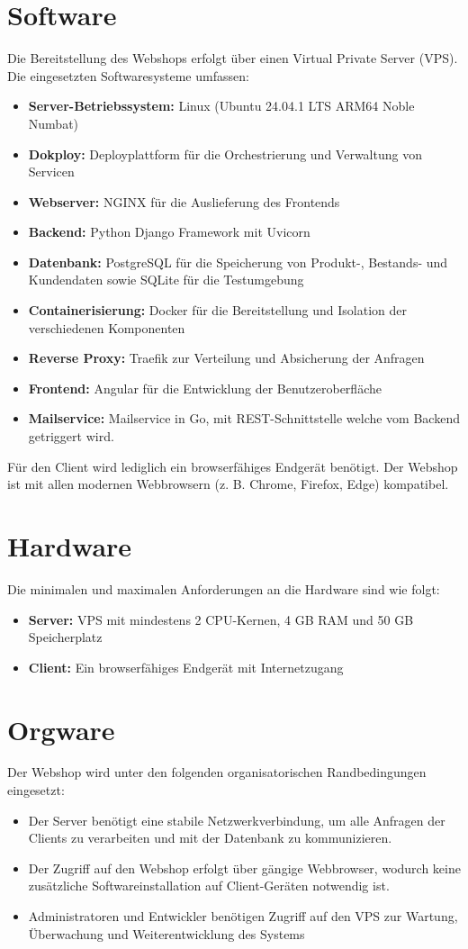 \documentclass[%
	12pt,
	a4paper,
	oneside,
	parskip=full
]{scrbook}
\begin{document}
\section{Software}
Die Bereitstellung des Webshops erfolgt über einen Virtual Private Server (VPS). Die eingesetzten Softwaresysteme umfassen:
\begin{itemize}
	\item \textbf{Server-Betriebssystem:} Linux (Ubuntu 24.04.1 LTS ARM64 Noble Numbat)
	\item \textbf{Dokploy:} Deployplattform für die Orchestrierung und Verwaltung von Servicen
	\item \textbf{Webserver:} NGINX für die Auslieferung des Frontends
	\item \textbf{Backend:} Python Django Framework mit Uvicorn
	\item \textbf{Datenbank:} PostgreSQL für die Speicherung von Produkt-, Bestands- und Kundendaten sowie SQLite für die Testumgebung
	\item \textbf{Containerisierung:} Docker für die Bereitstellung und Isolation der verschiedenen Komponenten
	\item \textbf{Reverse Proxy:} Traefik zur Verteilung und Absicherung der Anfragen
	\item \textbf{Frontend:} Angular für die Entwicklung der Benutzeroberfläche
	\item \textbf{Mailservice:} Mailservice in Go, mit REST-Schnittstelle welche vom Backend getriggert wird.
	\end{itemize}
Für den Client wird lediglich ein browserfähiges Endgerät benötigt. Der Webshop ist mit allen modernen Webbrowsern (z. B. Chrome, Firefox, Edge) kompatibel.

\section{Hardware}
Die minimalen und maximalen Anforderungen an die Hardware sind wie folgt:
\begin{itemize}
	\item \textbf{Server:} VPS mit mindestens 2 CPU-Kernen, 4 GB RAM und 50 GB Speicherplatz
	\item \textbf{Client:} Ein browserfähiges Endgerät mit Internetzugang
\end{itemize}

\section{Orgware}
Der Webshop wird unter den folgenden organisatorischen Randbedingungen eingesetzt:
\begin{itemize}
	\item Der Server benötigt eine stabile Netzwerkverbindung, um alle Anfragen der Clients zu verarbeiten und mit der Datenbank zu kommunizieren.
	\item Der Zugriff auf den Webshop erfolgt über gängige Webbrowser, wodurch keine zusätzliche Softwareinstallation auf Client-Geräten notwendig ist.
	\item Administratoren und Entwickler benötigen Zugriff auf den VPS zur Wartung, Überwachung und Weiterentwicklung des Systems
\end{itemize}
\end{document}
